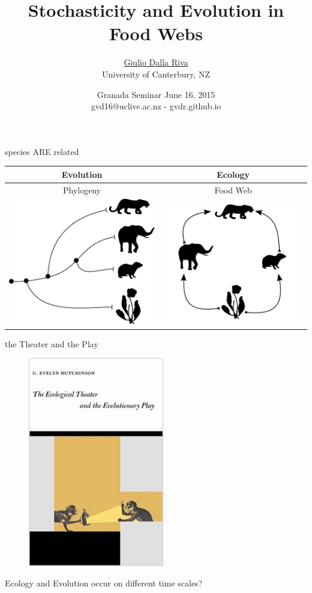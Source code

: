 \documentclass[ignorenonframetext,]{beamer}
\title{Stochasticity and Evolution in Food Webs}
\author{\href{http://gvdr.github.io}{Giulio Dalla Riva}\\ University of
Canterbury, NZ}
\date{Granada Seminar June 16, 2015\\ {\small gvd16@uclive.ac.nz - gvdr.github.io}}
\begin{document}
\frame{\titlepage}

\begin{frame}{species ARE related}

\centering
\begin{tabular}{|c|c|}\hline
Evolution & Ecology \\\hline\hline
Phylogeny & Food Web \\
\includegraphics[width=0.4 \textwidth]{images/small_phylo.pdf} & \includegraphics[width=0.4 \textwidth]{images/small_fw.pdf} \\ \hline
\end{tabular}

\end{frame}

\begin{frame}{the Theater and the Play}

\begin{figure}
\centering
\includegraphics[height=0.5 \textheight]{images/hutchinson_ecotheatreevoplay.jpg}
\end{figure}

{\small Ecology and Evolution occur on different time scales?}

\end{frame}
\end{document}
